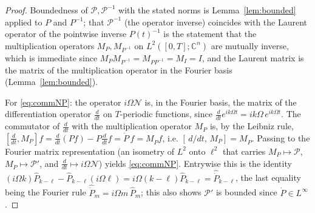 \documentclass{amsart}
\theoremstyle{definition}
\newcommand{\C}{\mathbb{C}}
\newcommand{\Ncal}{\mathcal{N}}
\begin{document}
\begin{proof}
Boundedness of $\mathcal P,\mathcal P^{-1}$ with the stated norms is
Lemma~\ref{lem:bounded} applied to $P$ and $P^{-1}$; that $\mathcal P^{-1}$ (the
operator inverse) coincides with the Laurent operator of the pointwise inverse
$P(t)^{-1}$ is the statement that the multiplication operators $M_P,M_{P^{-1}}$
on $L^2([0,T];\C^n)$ are mutually inverse, which is immediate since
$M_P M_{P^{-1}}=M_{PP^{-1}}=M_I=I$, and the Laurent matrix is the matrix of the
multiplication operator in the Fourier basis (Lemma~\ref{lem:bounded}).

For \eqref{eq:commNP}: the operator $i\Omega\Ncal$ is, in the Fourier basis, the
matrix of the differentiation operator $\tfrac{d}{dt}$ on $T$-periodic functions,
since $\tfrac{d}{dt}e^{ik\Omega t}=ik\Omega\,e^{ik\Omega t}$. The commutator of
$\tfrac{d}{dt}$ with the multiplication operator $M_P$ is, by the Leibniz rule,
$[\tfrac{d}{dt},M_P]f=\tfrac{d}{dt}(Pf)-P\tfrac{d}{dt}f=\dot P\,f=M_{\dot P}f$,
i.e. $[\,d/dt,\,M_P]=M_{\dot P}$. Passing to the Fourier matrix representation
(an isometry of $L^2$ onto $\ell^2$ that carries $M_P\mapsto\mathcal P$,
$M_{\dot P}\mapsto\mathcal P'$, and $\tfrac{d}{dt}\mapsto i\Omega\Ncal$) yields
\eqref{eq:commNP}. Entrywise this is the identity
$(i\Omega k)\hat P_{k-\ell}-\hat P_{k-\ell}(i\Omega\ell)=i\Omega(k-\ell)\hat P_{k-\ell}
=\widehat{\dot P}_{k-\ell}$, the last equality being the Fourier rule
$\widehat{\dot P}_{m}=i\Omega m\,\hat P_m$; this also shows $\mathcal P'$ is
bounded since $\dot P\in L^\infty$.


\end{proof}
\end{document}
